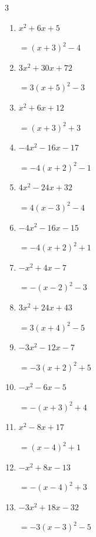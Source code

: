 \begin{multicols}{3}
\begin{enumerate}
        $=5\left( x-5\right)^{2}$

\columnbreak %

  \item $x^{2}+6x+5$

        $=\left( x+3\right)^{2}-4$

  \item $3x^{2}+30x+72$

        $=3\left( x+5\right)^{2}-3$

  \item $x^{2}+6x+12$

        $=\left( x+3\right)^{2}+3$

  \item $-4x^{2}-16x-17$

        $=-4\left( x+2\right)^{2}-1$

  \item $4x^{2}-24x+32$

        $=4\left( x-3\right)^{2}-4$

  \item $-4x^{2}-16x-15$

        $=-4\left( x+2\right)^{2}+1$

  \item $-x^{2}+4x-7$

        $=-\left( x-2\right)^{2}-3$

  \item $3x^{2}+24x+43$

        $=3\left( x+4\right)^{2}-5$

  \item $-3x^{2}-12x-7$

        $=-3\left( x+2\right)^{2}+5$

  \item $-x^{2}-6x-5$

        $=-\left( x+3\right)^{2}+4$

\columnbreak %

\resetques

  \item $x^{2}-8x+17$

        $=\left( x-4\right)^{2}+1$

  \item $-x^{2}+8x-13$

        $=-\left( x-4\right)^{2}+3$

  \item $-3x^{2}+18x-32$

        $=-3\left( x-3\right)^{2}-5$


\end{enumerate}
\end{multicols}
